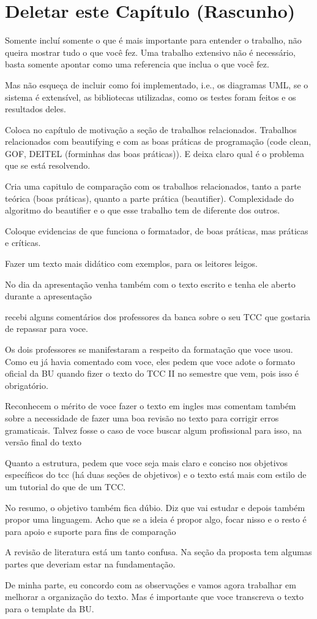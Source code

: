 

\chapter{Deletar este Capítulo (Rascunho)}

Somente incluí somente o que é mais importante para entender o trabalho, não
queira mostrar tudo o que você fez. Uma trabalho extensivo não é necessário,
basta somente apontar como uma referencia que inclua o que você fez.

Mas não esqueça de incluir como foi implementado, i.e., os diagramas UML, se
o sistema é extensível, as bibliotecas utilizadas, como os testes foram
feitos e os resultados deles.

Coloca no capítulo de motivação a seção de trabalhos relacionados. Trabalhos
relacionados com beautifying e com as boas práticas de programação (code clean,
GOF, DEITEL (forminhas das boas práticas)). E deixa claro qual é o problema
que se está resolvendo.

Cria uma capitulo de comparação com os trabalhos relacionados, tanto a parte
teórica (boas práticas), quanto a parte prática (beautifier). Complexidade do
algoritmo do beautifier e o que esse trabalho tem de diferente dos outros.

Coloque evidencias de que funciona o formatador, de boas práticas, mas
práticas e críticas.

Fazer um texto mais didático com exemplos, para os leitores leigos.

No dia da apresentação venha também com o texto escrito e tenha ele aberto durante a apresentação


recebi alguns comentários dos professores da banca sobre o seu TCC que
gostaria de repassar para voce.

Os dois professores se manifestaram a respeito da formatação que voce
usou. Como eu já havia comentado com voce, eles pedem que voce adote o
formato oficial da BU quando fizer o texto do TCC II no semestre que
vem, pois isso é obrigatório.

Reconhecem o mérito de voce fazer o texto em ingles mas comentam
também sobre a necessidade de fazer uma boa revisão no texto para
corrigir erros gramaticais. Talvez fosse o caso de voce buscar algum
profissional para isso, na versão final do texto

Quanto a estrutura, pedem que voce seja mais claro e conciso nos
objetivos específicos do tcc (há duas seções de objetivos) e o texto
está mais com estilo de um tutorial do que de um TCC.

No resumo, o objetivo também fica dúbio. Diz que vai estudar e depois
também propor uma linguagem. Acho que se a ideia é propor algo, focar
nisso e o resto é para apoio e suporte para fins de comparação

A revisão de literatura está um tanto confusa. Na seção da proposta
tem algumas partes que deveriam estar na fundamentação.

De minha parte, eu concordo com as observações e vamos agora trabalhar
em melhorar a organização do texto. Mas é importante que voce
transcreva o texto para o template da BU.
